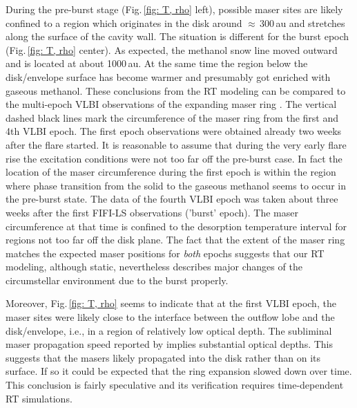 During the pre-burst stage (Fig.\,\ref{fig: T, rho} left), possible maser sites are likely confined to a region which originates in the disk around ${\approx}\,300$\,au and stretches along the surface of the cavity wall. The situation is different for the burst epoch (Fig.\,\ref{fig: T, rho} center). As expected, the methanol snow line moved outward and is located at about 1000\,au. At the same time the region below the disk/envelope surface has become warmer and presumably got enriched with gaseous methanol. These conclusions from the RT modeling can be compared to the multi-epoch VLBI observations of the expanding maser ring \citep[Burns et al., in prep.;]{2020NatAs...4..506B}.
The vertical dashed black lines mark the circumference of the maser ring from the first and 4th VLBI epoch. The first epoch observations were obtained already two weeks after the flare started. It is reasonable to assume that during the very early flare rise the excitation conditions were not too far off the pre-burst case. In fact the location of the maser circumference during the first epoch is within the region where phase transition from the solid to the gaseous methanol seems to occur in the pre-burst state. The data of the fourth VLBI epoch was taken about three weeks after the first FIFI-LS observations ('burst' epoch). The maser circumference at that time is confined to the desorption temperature interval for regions not too far off the disk plane. The fact that the extent of the maser ring matches the expected maser positions for {\em both} epochs suggests that our RT modeling, although static, nevertheless describes major changes of the circumstellar environment due to the burst properly.

Moreover, Fig.\,\ref{fig: T, rho} seems to indicate that at the first VLBI epoch, the maser sites were likely close to the interface between the outflow lobe and the disk/envelope,
i.e., in a region of relatively low optical depth. The subliminal maser propagation speed reported by \citet{2020NatAs...4..506B} implies substantial optical depths. This suggests that the masers likely propagated into the disk rather than on its surface.
If so it could be expected that the ring expansion slowed down over time. This conclusion is fairly speculative and its verification requires time-dependent RT simulations. 

